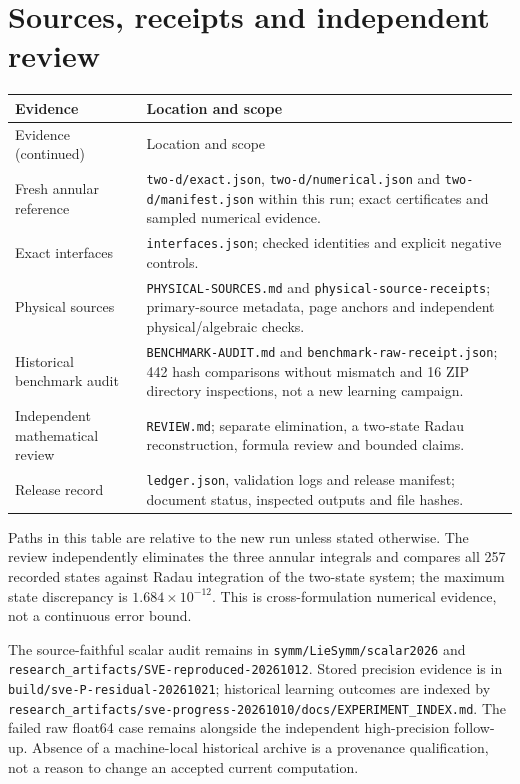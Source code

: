 \documentclass[11pt,a4paper,oneside]{report}
\numberwithin{equation}{chapter}
\DeclareRobustCommand{\code}[1]{\nolinkurl{#1}}
\begin{document}
\section{Sources, receipts and independent review}
\begin{longtable}{@{}>{\raggedright\arraybackslash}p{}>{\raggedright\arraybackslash}p{}@{}}
\toprule Evidence & Location and scope\\\midrule
\endfirsthead
\toprule Evidence (continued) & Location and scope\\\midrule
\endhead
Fresh annular reference & \code{two-d/exact.json}, \code{two-d/numerical.json} and \code{two-d/manifest.json} within this run; exact certificates and sampled numerical evidence.\\
Exact interfaces & \code{interfaces.json}; checked identities and explicit negative controls.\\
Physical sources & \code{PHYSICAL-SOURCES.md} and \code{physical-source-receipts}; primary-source metadata, page anchors and independent physical/algebraic checks.\\
Historical benchmark audit & \code{BENCHMARK-AUDIT.md} and \code{benchmark-raw-receipt.json}; 442 hash comparisons without mismatch and 16 ZIP directory inspections, not a new learning campaign.\\
Independent mathematical review & \code{REVIEW.md}; separate elimination, a two-state Radau reconstruction, formula review and bounded claims.\\
Release record & \code{ledger.json}, validation logs and release manifest; document status, inspected outputs and file hashes.\\\bottomrule
\end{longtable}
Paths in this table are relative to the new run unless stated otherwise.
The review independently eliminates the three annular integrals and compares
all 257 recorded states against Radau integration of the two-state system;
the maximum state discrepancy is $1.684\times10^{-12}$.
This is cross-formulation numerical evidence, not a continuous error bound.

The source-faithful scalar audit remains in
\code{symm/LieSymm/scalar2026} and
\code{research_artifacts/SVE-reproduced-20261012}. Stored precision evidence
is in \code{build/sve-P-residual-20261021}; historical learning outcomes are
indexed by \code{research_artifacts/sve-progress-20261010/docs/EXPERIMENT_INDEX.md}.
The failed raw float64 case remains alongside the independent high-precision
follow-up. Absence of a machine-local historical archive is a provenance
qualification, not a reason to change an accepted current computation.
\end{document}
